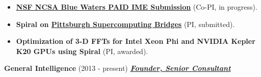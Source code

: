 \documentclass{article}
\newcommand{\employer}[3]{{ \textbf{#1} (#2) \underline{\textbf{\emph{#3}}}\\  }}
\begin{document}
\begin{itemize}
\begin{itemize}
          \item \textbf{\href{https://bluewaters.ncsa.illinois.edu/paid-ime-submissions}{NSF NCSA Blue Waters PAID IME Submission}} (Co-PI, in progress).

          \item \textbf{Spiral on \href{http://www.psc.edu/index.php/bridges}{Pittsburgh Supercomputing Bridges}} (PI, submitted). 

          \item \textbf{Optimization of 3-D FFTs for Intel Xeon Phi and NVIDIA Kepler K20 GPUs using Spiral} (PI, awarded).

        \end{itemize}


    \end{itemize}


\employer{General Intelligence}{2013 - present}{Founder, Senior Consultant}
\end{document}
